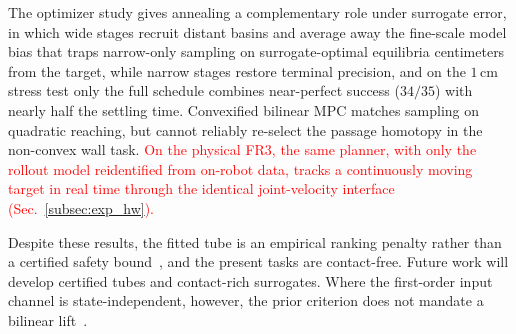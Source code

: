 \documentclass[letterpaper,10pt,conference]{ieeeconf}
\newcommand{\nd}[1]{\textcolor{red}{#1}}
\begin{document}
The optimizer study gives annealing a complementary role under surrogate error, in which wide stages recruit distant basins and average away the fine-scale model bias that traps narrow-only sampling on surrogate-optimal equilibria centimeters from the target, while narrow stages restore terminal precision, and on the $1$\,cm stress test only the full schedule combines near-perfect success ($34/35$) with nearly half the settling time.
Convexified bilinear MPC matches sampling on quadratic reaching, but cannot reliably re-select the passage homotopy in the non-convex wall task.
\nd{On the physical FR3, the same planner, with only the rollout model reidentified from on-robot data, tracks a continuously moving target in real time through the identical joint-velocity interface (Sec.~\ref{subsec:exp_hw}).}

Despite these results, the fitted tube is an empirical ranking penalty rather than a certified safety bound~\cite{safedmd2024}, and the present tasks are contact-free.
Future work will develop certified tubes and contact-rich surrogates. Where the first-order input channel is state-independent, however, the prior criterion does not mandate a bilinear lift~\cite{kim2026bilinear}.



\end{document}

